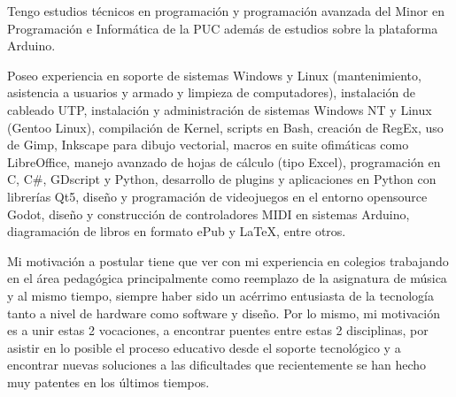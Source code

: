 

\begin{cvparagraph}

Tengo estudios técnicos en programación y programación avanzada del Minor en Programación e Informática de la PUC además de estudios sobre la plataforma Arduino.

Poseo experiencia en soporte de sistemas Windows y Linux (mantenimiento, asistencia a usuarios y armado y limpieza de computadores), instalación de cableado UTP, instalación y administración de sistemas Windows NT y Linux (Gentoo Linux), compilación de Kernel, scripts en Bash, creación de RegEx, uso de Gimp, Inkscape para dibujo vectorial, macros en suite ofimáticas como LibreOffice, manejo avanzado de hojas de cálculo (tipo Excel), programación en C, C\#, GDscript y Python, desarrollo de plugins y aplicaciones en Python con librerías Qt5, diseño y programación de videojuegos en el entorno opensource Godot, diseño y construcción de controladores MIDI en sistemas Arduino, diagramación de libros en formato ePub y LaTeX, entre otros.

Mi motivación a postular tiene que ver con mi experiencia en colegios trabajando en el área pedagógica principalmente como reemplazo de la asignatura de música y al mismo tiempo, siempre haber sido un acérrimo entusiasta de la tecnología tanto a nivel de hardware como software y diseño. Por lo mismo, mi motivación es a unir estas 2 vocaciones, a encontrar puentes entre estas 2 disciplinas, por asistir en lo posible el proceso educativo desde el soporte tecnológico y a encontrar nuevas soluciones a las dificultades que recientemente se han hecho muy patentes en los últimos tiempos.

\end{cvparagraph}